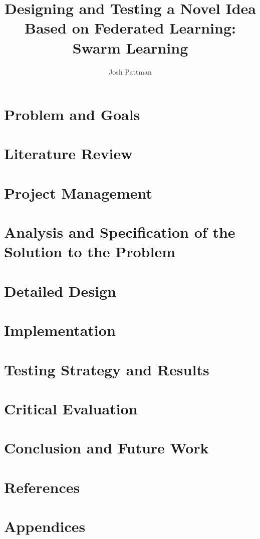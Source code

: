 \documentclass[12pt,a4paper]{report}
\author{Josh Pattman}
\title{Designing and Testing a Novel Idea Based on Federated Learning: Swarm Learning}
\begin{document}
	\maketitle
	\chapter{Problem and Goals}
	\chapter{Literature Review}
	\chapter{Project Management}
	\chapter{Analysis and Specification of the Solution to the Problem}
	\chapter{Detailed Design}
	
	\chapter{Implementation}
	
	
	\chapter{Testing Strategy and Results}
	
	\chapter{Critical Evaluation}
	\chapter{Conclusion and Future Work}
	\chapter{References}
	\chapter{Appendices}
\end{document}
